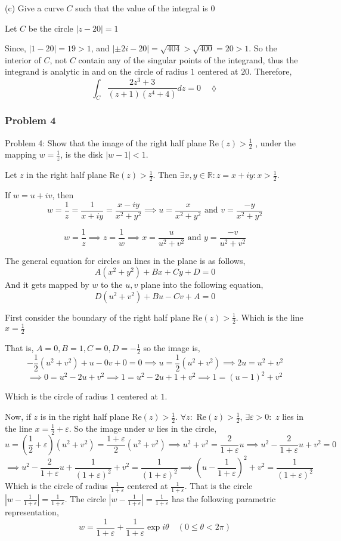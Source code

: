 \documentclass{article}
\newcommand\R{\mathbb{R}}
\begin{document}
 (c) Give a curve $C$ such that the value of the integral is $0$


 Let $C$ be the circle $|z-20| = 1$

 Since, $|1-20| = 19 >1$, and $|\pm 2i - 20| = \sqrt{404} > \sqrt{400}
 = 20 >1$. So the interior of $C$, not $C$ contain any of the singular points of the
 integrand, thus the integrand is analytic in and on the circle of radius
 $1$ centered at $20$. Therefore, \[\int_C
  \frac{2z^3+3}{(z+1)(z^4 +4)} dz = 0\quad \lozenge\]

\subsubsection*{Problem 4} Problem 4: Show that the image of the right
half plane Re$(z) > \frac{1}{2}$ , under the mapping $w = \frac{1}{z}$, is the disk
$|w − 1| < 1 $.


Let $z$ in the right half plane Re$(z) > \frac{1}{2}$. Then $\exists
x,y\in \R: z= x +
iy: x >\frac{1}{2}.$

If $w = u+iv$, then
\[w = \frac{1}{z} =\frac{1}{x+iy}  = \frac{x-iy}{x^2+y^2} \implies u =
  \frac{x}{x^2+y^2}\text{ and } v = \frac{-y}{x^2+y^2} \]

\[w = \frac{1}{z} \implies z = \frac{1}{w} \implies x =
  \frac{u}{u^2+v^2}\text{ and } y = \frac{-v}{u^2+v^2}\]

The general equation for circles an lines in the plane is as follows,
\[A(x^2+y^2)+Bx + Cy + D = 0\]
And it gets mapped by $w$ to the $u,v$ plane into the following
equation,
\[D(u^2+v^2)+Bu - Cv + A = 0\]

First consider the boundary of the right half plane Re$(z) >
\frac{1}{2}$. Which is the line $x = \frac{1}{2}$

That is, $A = 0, B=1, C= 0, D=-\frac{1}{2}$ so the image is,
\[-\frac{1}{2}(u^2+v^2)+u - 0v + 0 = 0\implies u =
  \frac{1}{2}(u^2+v^2) \implies 2u =
  u^2+v^2\]
\[ \implies 0 =
  u^2-2u +v^2 \implies  1 =
  u^2-2u + 1 +v^2 \implies  1 =
  (u- 1)^2 +v^2\]

Which is the circle of radius $1$ centered at $1$.

Now, if $z$ is in the right half plane Re$(z) >
\frac{1}{2}$. $\forall z:$ Re$ (z) > \frac{1}{2}$, $\exists \varepsilon > 0:$ $z$ lies in the line $x =
\frac{1}{2} +\varepsilon$. So the image under $w$ lies in the circle,
\[u =
  \left(\frac{1}{2}+\varepsilon\right)(u^2+v^2) =
  \frac{1+\varepsilon}{2}(u^2+v^2)\implies u^2+v^2 =
  \frac{2}{1+\varepsilon}u \implies u^2-\frac{2}{1+\varepsilon}u +v^2
  = 0 \]
\[\implies u^2-\frac{2}{1+\varepsilon}u + \frac{1}{(1+\varepsilon)^2} +v^2
  = \frac{1}{(1+\varepsilon)^2} \implies  \left(u-\frac{1}{1+\varepsilon}\right)^2 +v^2
  = \frac{1}{(1+\varepsilon)^2}\]
Which is the circle of radius $\frac{1}{1+\varepsilon}$ centered
at $\frac{1}{1+\varepsilon}.$ That is the circle
$|w-\frac{1}{1+\varepsilon}| = \frac{1}{1+\varepsilon}$.
The circle $|w -\frac{1}{1+\varepsilon}|=
\frac{1}{1+\varepsilon}$ has the following parametric representation,
\[ w = \frac{1}{1+\varepsilon} + \frac{1}{1+\varepsilon} \exp
  i\theta \quad(0\leq \theta < 2\pi)\]
\end{document}
